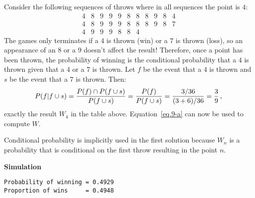 
 Consider the following sequences of throws where in all sequences the point is $4$:
\[
\begin{array}{rrrrrrrrrrr}
4 & 8 & 9 & 9 & 9 & 8 & 8 & 8 & 9 & 8 & 4\\
4 & 8 & 9 & 9 & 9 & 8 & 8 & 8 & 9 & 8 & 7\\
4 & 9 & 9 & 9 & 8 & 8 & 4
\end{array}
\]
The games only terminates if a $4$ is thrown (win) or a $7$ is thrown (loss), so an appearance of an $8$ or a $9$ doesn't affect the result! Therefore, once a point has been thrown, the probability of winning is the conditional probability that a $4$ is thrown given that a $4$ or  a $7$ is thrown. Let $f$ be the event that a $4$ is thrown and $s$ be the event that a $7$ is thrown. Then:
\[
P(f|f\cup s) = \displaystyle\frac{P(f)\cap P(f\cup s)}{P(f\cup s)}=\displaystyle\frac{P(f)}{P(f\cup s)}=\displaystyle\frac{3/36}{(3+6)/36}=\displaystyle\frac{3}{9}\,,
\]
exactly the result $W_4$ in the table above. Equation~\ref{eq.9-a} can now be used to compute $W$.

Conditional probability is implicitly used in the first solution because $W_n$ is a probability that is conditional on the first throw resulting in the point $n$.

\textbf{Simulation}
\begin{verbatim}
Probability of winning = 0.4929
Proportion of wins     = 0.4948
\end{verbatim}



